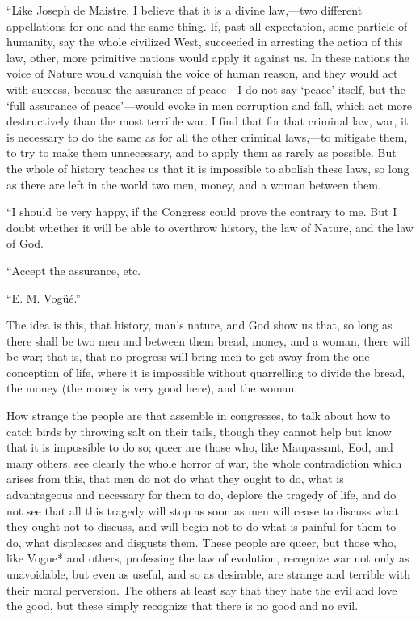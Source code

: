 \documentclass{book}
\begin{document}
“Like Joseph de Maistre, I believe that it is a divine law,—two different appellations for one and the same thing. If, past all expectation, some particle of humanity, say the whole civilized West, succeeded in arresting the action of this law, other, more primitive nations would apply it against us. In these nations the voice of Nature would vanquish the voice of human reason, and they would act with success, because the assurance of peace—I do not say ‘peace’ itself, but the ‘full assurance of peace’—would evoke in men corruption and fall, which act more destructively than the most terrible war. I find that for that criminal law, war, it is necessary to do the same as for all the other criminal laws,—to mitigate them, to try to make them unnecessary, and to apply them as rarely as possible. But the whole of history teaches us that it is impossible to abolish these laws, so long as there are left in the world two men, money, and a woman between them.

“I should be very happy, if the Congress could prove the contrary to me. But I doubt whether it will be able to overthrow history, the law of Nature, and the law of God.

“Accept the assurance, etc.

“E. M. Vogüé.”

The idea is this, that history, man’s nature, and God show us that, so long as there shall be two men and between them bread, money, and a woman, there will be war; that is, that no progress will bring men to get away from the one conception of life, where it is impossible without quarrelling to divide the bread, the money (the money is very good here), and the woman.

How strange the people are that assemble in congresses, to talk about how to catch birds by throwing salt on their tails, though they cannot help but know that it is impossible to do so; queer are those who, like Maupassant, Eod, and many others, see clearly the whole horror of war, the whole contradiction which arises from this, that men do not do what they ought to do, what is advantageous and necessary for them to do, deplore the tragedy of life, and do not see that all this tragedy will stop as soon as men will cease to discuss what they ought not to discuss, and will begin not to do what is painful for them to do, what displeases and disgusts them. These people are queer, but those who, like Vogue* and others, professing the law of evolution, recognize war not only as unavoidable, but even as useful, and so as desirable, are strange and terrible with their moral perversion. The others at least say that they hate the evil and love the good, but these simply recognize that there is no good and no evil.
\end{document}
